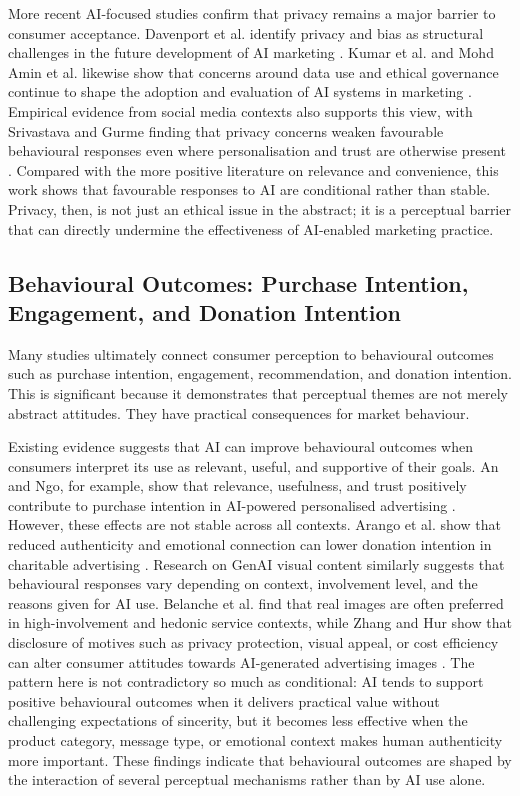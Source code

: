 More recent AI-focused studies confirm that privacy remains a major barrier to consumer acceptance. Davenport et al. identify privacy and bias as structural challenges in the future development of AI marketing \cite{davenport2020future}. Kumar et al. and Mohd Amin et al. likewise show that concerns around data use and ethical governance continue to shape the adoption and evaluation of AI systems in marketing \cite{kumar2024aipowered,mohdamin2025adoption}. Empirical evidence from social media contexts also supports this view, with Srivastava and Gurme finding that privacy concerns weaken favourable behavioural responses even where personalisation and trust are otherwise present \cite{srivastava2026social}. Compared with the more positive literature on relevance and convenience, this work shows that favourable responses to AI are conditional rather than stable. Privacy, then, is not just an ethical issue in the abstract; it is a perceptual barrier that can directly undermine the effectiveness of AI-enabled marketing practice.

\subsection{Behavioural Outcomes: Purchase Intention, Engagement, and Donation Intention}
Many studies ultimately connect consumer perception to behavioural outcomes such as purchase intention, engagement, recommendation, and donation intention. This is significant because it demonstrates that perceptual themes are not merely abstract attitudes. They have practical consequences for market behaviour.

Existing evidence suggests that AI can improve behavioural outcomes when consumers interpret its use as relevant, useful, and supportive of their goals. An and Ngo, for example, show that relevance, usefulness, and trust positively contribute to purchase intention in AI-powered personalised advertising \cite{an2025personalized}. However, these effects are not stable across all contexts. Arango et al. show that reduced authenticity and emotional connection can lower donation intention in charitable advertising \cite{arango2023charitable}. Research on GenAI visual content similarly suggests that behavioural responses vary depending on context, involvement level, and the reasons given for AI use. Belanche et al. find that real images are often preferred in high-involvement and hedonic service contexts, while Zhang and Hur show that disclosure of motives such as privacy protection, visual appeal, or cost efficiency can alter consumer attitudes towards AI-generated advertising images \cite{belanche2025images,zhang2025images}. The pattern here is not contradictory so much as conditional: AI tends to support positive behavioural outcomes when it delivers practical value without challenging expectations of sincerity, but it becomes less effective when the product category, message type, or emotional context makes human authenticity more important. These findings indicate that behavioural outcomes are shaped by the interaction of several perceptual mechanisms rather than by AI use alone.

